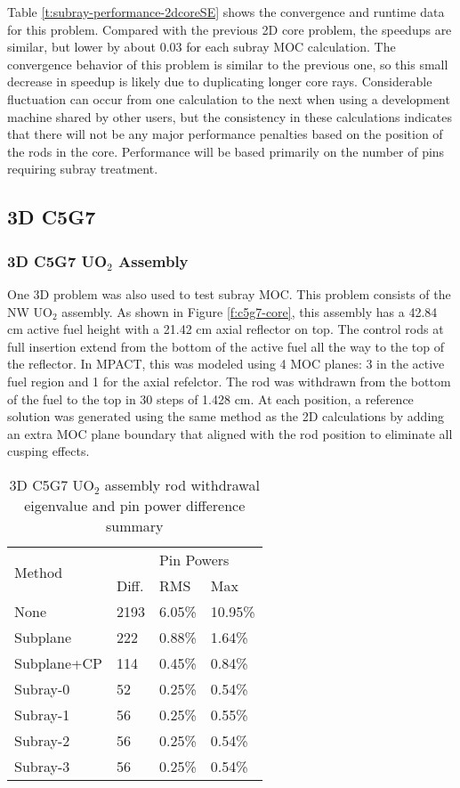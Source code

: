 Table \ref{t:subray-performance-2dcoreSE} shows the convergence and runtime data for this problem.  Compared with the previous 2D core problem, the speedups are similar, but lower by about 0.03 for each subray MOC calculation.  The convergence behavior of this problem is similar to the previous one, so this small decrease in speedup is likely due to duplicating longer core rays.  Considerable fluctuation can occur from one calculation to the next when using a development machine shared by other users, but the consistency in these calculations indicates that there will not be any major performance penalties based on the position of the rods in the core.  Performance will be based primarily on the number of pins requiring subray treatment.

\subsection{3D C5G7}

\subsubsection{3D C5G7 UO\texorpdfstring{$_2$}{2} Assembly}

One 3D problem was also used to test subray MOC.  This problem consists of the NW UO$_2$ assembly.  As shown in Figure \ref{f:c5g7-core}, this assembly has a 42.84 cm active fuel height with a 21.42 cm axial reflector on top.  The control rods at full insertion extend from the bottom of the active fuel all the way to the top of the reflector.  In MPACT, this was modeled using 4 MOC planes: 3 in the active fuel region and 1 for the axial refelctor.  The rod was withdrawn from the bottom of the fuel to the top in 30 steps of 1.428 cm.  At each position, a reference solution was generated using the same method as the 2D calculations by adding an extra MOC plane boundary that aligned with the rod position to eliminate all cusping effects.

\begin{table}
    \centering
    \caption[3D C5G7 UO$_2$ Assembly Recombination Sensitivity]{3D C5G7 UO$_2$ assembly rod withdrawal eigenvalue and pin power difference summary}\label{t:c5g7-3d-assembly}
    \begin{tabular}{l l l l}\toprule
        \multirow{2}{*}{Method} & \keff{} & \multicolumn{2}{l}{Pin Powers} \\
         & Diff. & RMS & Max \\\midrule
None        & 2193 & 6.05\% & 10.95\% \\
Subplane    & 222  & 0.88\% &  1.64\% \\
Subplane+CP & 114  & 0.45\% &  0.84\% \\
Subray-0    & 52   & 0.25\% &  0.54\% \\
Subray-1    & 56   & 0.25\% &  0.55\% \\
Subray-2    & 56   & 0.25\% &  0.54\% \\
Subray-3    & 56   & 0.25\% &  0.54\% \\
         \bottomrule
    \end{tabular}
\end{table}

